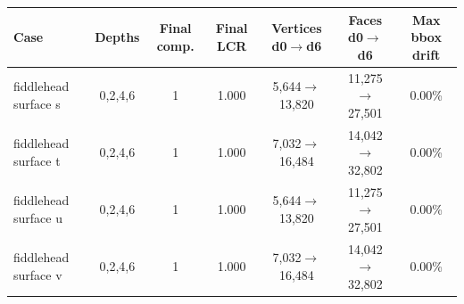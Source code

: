 \begin{tabular}{lcccccc}
\toprule
Case & Depths & Final comp. & Final LCR & Vertices d0$\to$d6 & Faces d0$\to$d6 & Max bbox drift \\
\midrule
fiddlehead surface s & 0,2,4,6 & 1 & 1.000 & 5,644$\to$13,820 & 11,275$\to$27,501 & 0.00\% \\
fiddlehead surface t & 0,2,4,6 & 1 & 1.000 & 7,032$\to$16,484 & 14,042$\to$32,802 & 0.00\% \\
fiddlehead surface u & 0,2,4,6 & 1 & 1.000 & 5,644$\to$13,820 & 11,275$\to$27,501 & 0.00\% \\
fiddlehead surface v & 0,2,4,6 & 1 & 1.000 & 7,032$\to$16,484 & 14,042$\to$32,802 & 0.00\% \\
\bottomrule
\end{tabular}
